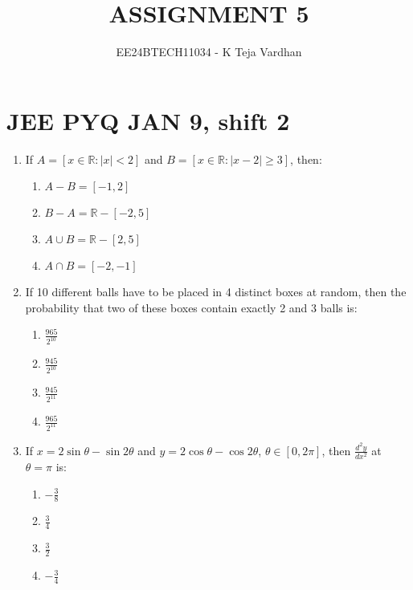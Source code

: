 \documentclass[journal]{IEEEtran}
\newcommand{\sbrak}[1]{\left[ #1 \right]}
\newcommand{\abs}[1]{\left| #1 \right|}
\newcommand{\lt}{<}
\begin{document}

\title{ASSIGNMENT 5}
\author{EE24BTECH11034 - K Teja Vardhan}
{\let\newpage\relax\maketitle}

\section{JEE PYQ JAN 9, shift 2}
\begin{enumerate}

    \item If $ A = \sbrak{ x \in \mathbb{R} : \abs{x} \lt 2 } $ and $ B = \sbrak{ x \in \mathbb{R} : \abs{x - 2} \geq 3 } $, then:
        \begin{multicols}{4}
        \begin{enumerate}
            \item $ A - B = \sbrak{ -1, 2 } $  
            \item $ B - A = \mathbb{R} - \sbrak{ -2, 5 } $  
            \item $ A \cup B = \mathbb{R} - \sbrak{ 2, 5 } $  
            \item $ A \cap B = \sbrak{ -2, -1 } $
        \end{enumerate}
        \end{multicols}

    \item If 10 different balls have to be placed in 4 distinct boxes at random, then the probability that two of these boxes contain exactly 2 and 3 balls is:
        \begin{multicols}{4}
        \begin{enumerate}
            \item $ \frac{965}{2^{10}} $  
            \item $ \frac{945}{2^{10}} $  
            \item $ \frac{945}{2^{11}} $  
            \item $ \frac{965}{2^{11}} $
        \end{enumerate}
        \end{multicols}

    \item If $ x = 2 \sin \theta - \sin 2 \theta $ and $ y = 2 \cos \theta - \cos 2 \theta $, $ \theta \in \sbrak{ 0, 2\pi } $, then $ \frac{d^2y}{dx^2} $ at $ \theta = \pi $ is:
        \begin{multicols}{4}
        \begin{enumerate}
            \item $ -\frac{3}{8} $  
            \item $ \frac{3}{4} $  
            \item $ \frac{3}{2} $  
            \item $ -\frac{3}{4} $
        \end{enumerate}
        \end{multicols}


\end{enumerate}
\end{document}
